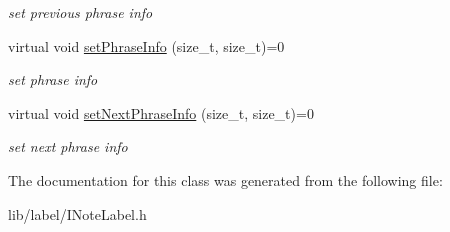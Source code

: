 \begin{DoxyCompactItemize}
\begin{DoxyCompactList}\small\item\em set previous phrase info \end{DoxyCompactList}\item 
\hypertarget{classsinsy_1_1INoteLabel_acbc3eab9267025b6a62a0d5d76ec7c65}{virtual void \hyperlink{classsinsy_1_1INoteLabel_acbc3eab9267025b6a62a0d5d76ec7c65}{set\-Phrase\-Info} (size\-\_\-t, size\-\_\-t)=0}\label{classsinsy_1_1INoteLabel_acbc3eab9267025b6a62a0d5d76ec7c65}

\begin{DoxyCompactList}\small\item\em set phrase info \end{DoxyCompactList}\item 
\hypertarget{classsinsy_1_1INoteLabel_aa2cb2cba5f212ec43e1043987260eed8}{virtual void \hyperlink{classsinsy_1_1INoteLabel_aa2cb2cba5f212ec43e1043987260eed8}{set\-Next\-Phrase\-Info} (size\-\_\-t, size\-\_\-t)=0}\label{classsinsy_1_1INoteLabel_aa2cb2cba5f212ec43e1043987260eed8}

\begin{DoxyCompactList}\small\item\em set next phrase info \end{DoxyCompactList}\end{DoxyCompactItemize}


\-The documentation for this class was generated from the following file\-:\begin{DoxyCompactItemize}
\item 
lib/label/\-I\-Note\-Label.\-h\end{DoxyCompactItemize}
